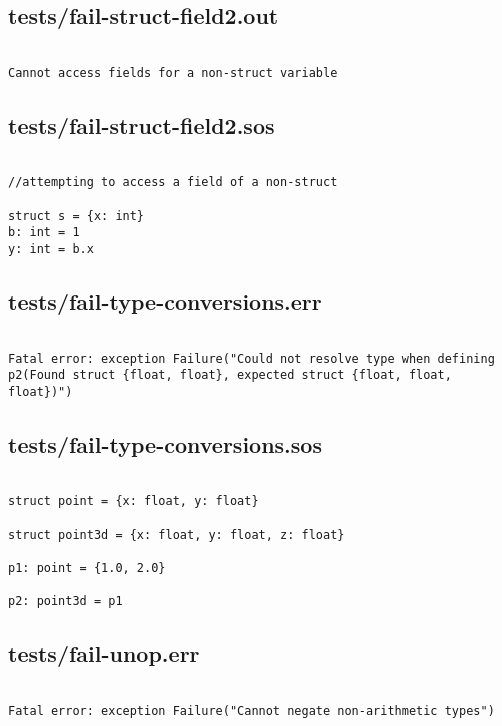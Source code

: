 \documentclass[main.tex]{subfiles}
\begin{document}
\subsection{tests/fail-struct-field2.out}

\begin{lstlisting}

Cannot access fields for a non-struct variable
\end{lstlisting}

\subsection{tests/fail-struct-field2.sos}

\begin{lstlisting}

//attempting to access a field of a non-struct

struct s = {x: int}
b: int = 1
y: int = b.x
\end{lstlisting}

\subsection{tests/fail-type-conversions.err}

\begin{lstlisting}

Fatal error: exception Failure("Could not resolve type when defining p2(Found struct {float, float}, expected struct {float, float, float})")
\end{lstlisting}

\subsection{tests/fail-type-conversions.sos}

\begin{lstlisting}

struct point = {x: float, y: float}

struct point3d = {x: float, y: float, z: float}

p1: point = {1.0, 2.0}

p2: point3d = p1
\end{lstlisting}

\subsection{tests/fail-unop.err}

\begin{lstlisting}

Fatal error: exception Failure("Cannot negate non-arithmetic types")
\end{lstlisting}
\end{document}
